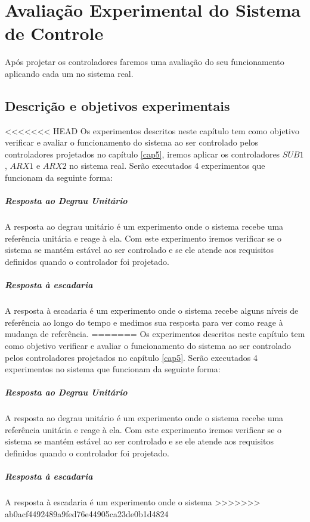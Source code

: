 \chapter{Avaliação Experimental do Sistema de Controle}\label{cap6}
Após projetar os controladores faremos uma avaliação do seu funcionamento aplicando cada um no sistema real.
\section{Descrição e objetivos experimentais}
<<<<<<< HEAD
Os experimentos descritos neste capítulo tem como objetivo verificar e avaliar o funcionamento do sistema ao ser controlado pelos controladores projetados no capítulo \ref{cap5}, iremos aplicar os controladores $SUB1$, $ARX1$ e $ARX2$ no sistema real. Serão executados 4 experimentos que funcionam da seguinte forma:
\paragraph{Resposta ao Degrau Unitário} A resposta ao degrau unitário é um experimento onde o sistema recebe uma referência unitária e reage à ela. Com este experimento iremos verificar se o sistema se mantém estável ao ser controlado e se ele atende aos requisitos definidos quando o controlador foi projetado.
\paragraph{Resposta à escadaria} A resposta à escadaria é um experimento onde o sistema recebe alguns níveis de referência ao longo do tempo e medimos sua resposta para ver como reage à mudança de referência.
=======
Os experimentos descritos neste capítulo tem como objetivo verificar e avaliar o funcionamento do sistema ao ser controlado pelos controladores projetados no capítulo \ref{cap5}. Serão executados 4 experimentos no sistema que funcionam da seguinte forma:
\paragraph{Resposta ao Degrau Unitário} A resposta ao degrau unitário é um experimento onde o sistema recebe uma referência unitária e reage à ela. Com este experimento iremos verificar se o sistema se mantém estável ao ser controlado e se ele atende aos requisitos  definidos quando o controlador foi projetado.
\paragraph{Resposta à escadaria} A resposta à escadaria é um experimento onde o sistema 
>>>>>>> ab0acf4492489a9fed76e44905ca23de0b1d4824

